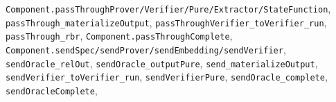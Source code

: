 \texttt{C\allowbreak{}o\allowbreak{}m\allowbreak{}p\allowbreak{}o\allowbreak{}n\allowbreak{}e\allowbreak{}n\allowbreak{}t\allowbreak{}.\allowbreak{}p\allowbreak{}a\allowbreak{}s\allowbreak{}s\allowbreak{}T\allowbreak{}h\allowbreak{}r\allowbreak{}o\allowbreak{}u\allowbreak{}g\allowbreak{}h\allowbreak{}P\allowbreak{}r\allowbreak{}o\allowbreak{}v\allowbreak{}e\allowbreak{}r\allowbreak{}/\allowbreak{}V\allowbreak{}e\allowbreak{}r\allowbreak{}i\allowbreak{}f\allowbreak{}i\allowbreak{}e\allowbreak{}r\allowbreak{}/\allowbreak{}P\allowbreak{}u\allowbreak{}r\allowbreak{}e\allowbreak{}/\allowbreak{}E\allowbreak{}x\allowbreak{}t\allowbreak{}r\allowbreak{}a\allowbreak{}c\allowbreak{}t\allowbreak{}o\allowbreak{}r\allowbreak{}/\allowbreak{}S\allowbreak{}t\allowbreak{}a\allowbreak{}t\allowbreak{}e\allowbreak{}F\allowbreak{}u\allowbreak{}n\allowbreak{}c\allowbreak{}t\allowbreak{}i\allowbreak{}o\allowbreak{}n}, \texttt{p\allowbreak{}a\allowbreak{}s\allowbreak{}s\allowbreak{}T\allowbreak{}h\allowbreak{}r\allowbreak{}o\allowbreak{}u\allowbreak{}g\allowbreak{}h\allowbreak{}\_\allowbreak{}m\allowbreak{}a\allowbreak{}t\allowbreak{}e\allowbreak{}r\allowbreak{}i\allowbreak{}a\allowbreak{}l\allowbreak{}i\allowbreak{}z\allowbreak{}e\allowbreak{}O\allowbreak{}u\allowbreak{}t\allowbreak{}p\allowbreak{}u\allowbreak{}t}, \texttt{p\allowbreak{}a\allowbreak{}s\allowbreak{}s\allowbreak{}T\allowbreak{}h\allowbreak{}r\allowbreak{}o\allowbreak{}u\allowbreak{}g\allowbreak{}h\allowbreak{}V\allowbreak{}e\allowbreak{}r\allowbreak{}i\allowbreak{}f\allowbreak{}i\allowbreak{}e\allowbreak{}r\allowbreak{}\_\allowbreak{}t\allowbreak{}o\allowbreak{}V\allowbreak{}e\allowbreak{}r\allowbreak{}i\allowbreak{}f\allowbreak{}i\allowbreak{}e\allowbreak{}r\allowbreak{}\_\allowbreak{}r\allowbreak{}u\allowbreak{}n}, \texttt{passThrough\_\allowbreak{}rbr}, \texttt{C\allowbreak{}o\allowbreak{}m\allowbreak{}p\allowbreak{}o\allowbreak{}n\allowbreak{}e\allowbreak{}n\allowbreak{}t\allowbreak{}.\allowbreak{}p\allowbreak{}a\allowbreak{}s\allowbreak{}s\allowbreak{}T\allowbreak{}h\allowbreak{}r\allowbreak{}o\allowbreak{}u\allowbreak{}g\allowbreak{}h\allowbreak{}C\allowbreak{}o\allowbreak{}m\allowbreak{}p\allowbreak{}l\allowbreak{}e\allowbreak{}t\allowbreak{}e}, \texttt{C\allowbreak{}o\allowbreak{}m\allowbreak{}p\allowbreak{}o\allowbreak{}n\allowbreak{}e\allowbreak{}n\allowbreak{}t\allowbreak{}.\allowbreak{}s\allowbreak{}e\allowbreak{}n\allowbreak{}d\allowbreak{}S\allowbreak{}p\allowbreak{}e\allowbreak{}c\allowbreak{}/\allowbreak{}s\allowbreak{}e\allowbreak{}n\allowbreak{}d\allowbreak{}P\allowbreak{}r\allowbreak{}o\allowbreak{}v\allowbreak{}e\allowbreak{}r\allowbreak{}/\allowbreak{}s\allowbreak{}e\allowbreak{}n\allowbreak{}d\allowbreak{}E\allowbreak{}m\allowbreak{}b\allowbreak{}e\allowbreak{}d\allowbreak{}d\allowbreak{}i\allowbreak{}n\allowbreak{}g\allowbreak{}/\allowbreak{}s\allowbreak{}e\allowbreak{}n\allowbreak{}d\allowbreak{}V\allowbreak{}e\allowbreak{}r\allowbreak{}i\allowbreak{}f\allowbreak{}i\allowbreak{}e\allowbreak{}r}, \texttt{sendOracle\_\allowbreak{}relOut}, \texttt{sendOracle\_\allowbreak{}outputPure}, \texttt{send\_\allowbreak{}materializeOutput}, \texttt{sendVerifier\_\allowbreak{}toVerifier\_\allowbreak{}run}, \texttt{sendVerifierPure}, \texttt{sendOracle\_\allowbreak{}complete}, \texttt{sendOracleComplete}, 